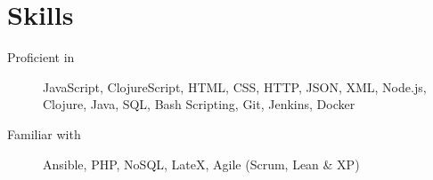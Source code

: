 \section*{Skills}
\begin{description}
  \item[Proficient in] JavaScript, ClojureScript, HTML, CSS, HTTP, JSON, XML,
    Node.js, Clojure, Java, SQL, Bash Scripting, Git, Jenkins, Docker
  \item[Familiar with] Ansible, PHP, NoSQL, LateX, Agile (Scrum, Lean \& XP)
\end{description}
